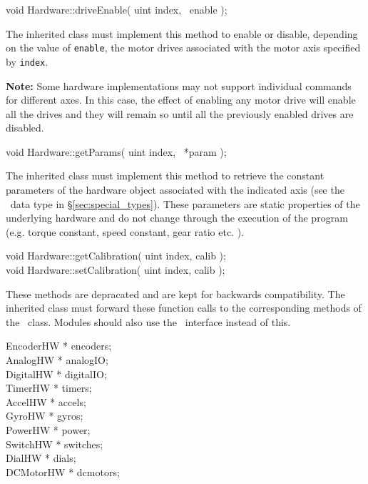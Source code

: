 \begin{prototype}
void Hardware::driveEnable( uint index, \bool\ enable );
\end{prototype}

The inherited class must implement this method to enable or disable,
depending on the value of {\tt enable}, the motor drives associated with the
motor axis specified by {\tt index}.

{\bf Note:} Some hardware implementations may not support individual
commands for different axes. In this case, the effect of enabling any motor
drive will enable all the drives and they will remain so until all the
previously enabled drives are disabled.

\begin{prototype}
void Hardware::getParams( uint index, \hwparam\ *param );
\end{prototype}

The inherited class must implement this method to retrieve the constant
parameters of the hardware object associated with the indicated axis (see
the \hwparam\ data type in \S\ref{sec:special_types}). These parameters are
static properties of the underlying hardware and do not change through the
execution of the program (e.g. torque constant, speed constant, gear ratio
etc. ).

\begin{prototype}
void Hardware::getCalibration( uint index, \hwcalib *calib ); \\
void Hardware::setCalibration( uint index, \hwcalib *calib );
\end{prototype}

These methods are depracated and are kept for backwards compatibility. The
inherited class must forward these function calls to the corresponding
methods of the \DCMotorHW\ class. Modules should also use the \DCMotorHW\
interface instead of this.

\begin{prototype}
EncoderHW   * encoders; \\
AnalogHW    * analogIO; \\
DigitalHW   * digitalIO; \\
TimerHW     * timers; \\
AccelHW     * accels; \\
GyroHW      * gyros; \\
PowerHW     * power; \\
SwitchHW    * switches; \\
DialHW      * dials; \\
DCMotorHW   * dcmotors;
\end{prototype}

